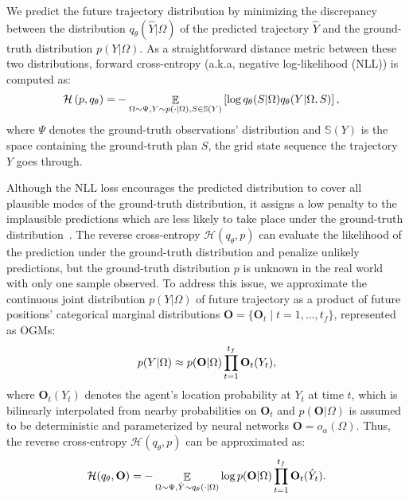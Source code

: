 \documentclass[10pt,twocolumn,letterpaper]{article}
\begin{document}
We predict the future trajectory distribution by minimizing the discrepancy between the distribution $q_\theta(\hat{Y}|\Omega)$ of the predicted trajectory $\hat{Y}$ and the ground-truth distribution $p(Y|\Omega)$. As a straightforward distance metric between these two distributions, forward cross-entropy (a.k.a, negative log-likelihood (NLL)) is computed as:
\begin{equation}
\begin{aligned}
\mathcal{H}\left(p, q_{\theta}\right)=&-\mathop{\mathbb{E}}\limits_{\Omega \sim \Psi,Y \sim p(\cdot|\Omega), S \in \mathbb{S}(Y)} \left[\log  q_{\theta}(S|\Omega)q_{\theta}(Y|\Omega, S)\right], \notag
\end{aligned}
\end{equation}
where $\Psi$ denotes the ground-truth observations' distribution and $\mathbb{S}(Y)$ is the space containing the ground-truth plan $S$, \ie the grid state sequence the trajectory $Y$ goes through.

Although the NLL loss encourages the predicted distribution to cover all plausible modes of the ground-truth distribution, it assigns a low penalty to the implausible predictions which are less likely to take place under the ground-truth distribution~\cite{rhinehart2018r2p2,park2020diverse}. The reverse cross-entropy $\mathcal{H}(q_\theta,p)$ can evaluate the likelihood of the prediction under the ground-truth distribution and penalize unlikely predictions, but the ground-truth distribution $p$ is unknown in the real world with only one sample observed. To address this issue, we approximate the continuous joint distribution $p(Y|\Omega)$ of future trajectory as a product of future positions' categorical marginal distributions $\mathbf{O}=\{\mathbf{O}_t\mid t=1,\dots,t_f\}$, represented as OGMs:
\begin{equation}
    p(Y|\Omega) \approx p(\mathbf{O}|\Omega) \prod \limits_{t=1}^{t_f} \mathbf{O}_t(Y_t) , \notag
\end{equation}
where $\mathbf{O}_t(Y_t)$ denotes the agent's location probability at $Y_t$ at time $t$, which is bilinearly interpolated from nearby probabilities on $\mathbf{O}_t$ and $p(\mathbf{O}|\Omega)$ is assumed to be deterministic and parameterized by neural networks $\mathbf{O}=o_\alpha(\Omega)$. Thus, the reverse cross-entropy $\mathcal{H}(q_\theta,p)$ can be approximated as:
\begin{equation}
\mathcal{H}(q_\theta,\mathbf{O}) = -\mathop{\mathbb{E}}\limits_{\Omega \sim \Psi,\hat{Y} \sim q_\theta(\cdot|\Omega)}\log p(\mathbf{O}|\Omega)\prod  \limits_{t=1}^{t_f} \mathbf{O}_t(\hat{Y}_t). \notag
\end{equation}
\end{document}
